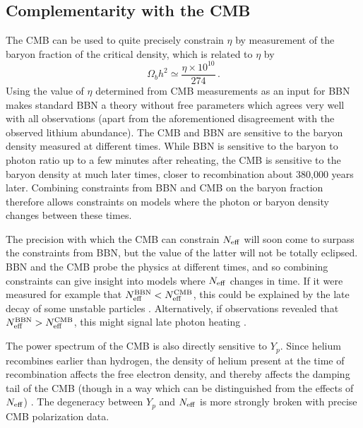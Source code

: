 



\subsection{Complementarity with the CMB}\label{Complementarity}
The CMB can be used to quite precisely constrain $\eta$ by measurement of the baryon fraction of the critical density, which is related to $\eta$ by
\begin{equation}
	\Omega_b h^2 \simeq \frac{\eta\times10^{10}}{274} \, .
\end{equation}
Using the value of $\eta$ determined from CMB measurements as an input for BBN makes standard BBN a theory without free parameters which agrees very well with all observations (apart from the aforementioned disagreement with the observed lithium abundance).  The CMB and BBN are sensitive to the baryon density measured at different times.  While BBN is sensitive to the baryon to photon ratio up to a few minutes after reheating, the CMB is sensitive to the baryon density at much later times, closer to recombination about 380,000 years later.  Combining constraints from BBN and CMB on the baryon fraction therefore allows constraints on models where the photon or baryon density changes between these times.

The precision with which the CMB can constrain $N_{\rm eff}$ will soon come to surpass the constraints from BBN, but the value of the latter will not be totally eclipsed.  BBN and the CMB probe the physics at different times, and so combining constraints can give insight into models where $N_{\rm eff}$ changes in time.  If it were measured for example that $N_{\rm eff}^{\mathrm{BBN}}<N_{\rm eff}^{\mathrm{CMB}}$, this could be explained by the late decay of some unstable particles \cite{Fischler:2010xz,Menestrina:2011mz,Hooper:2011aj}.  Alternatively, if observations revealed that $N_{\rm eff}^{\mathrm{BBN}}>N_{\rm eff}^{\mathrm{CMB}}$, this might signal late photon heating \cite{Cadamuro:2010cz,Millea:2015qra}.

The power spectrum of the CMB is also directly sensitive to $Y_p$.  Since helium recombines earlier than hydrogen, the density of helium present at the time of recombination affects the free electron density, and thereby affects the damping tail of the CMB (though in a way which can be distinguished from the effects of $N_{\rm eff}$) \cite{Bashinsky:2003tk,Hou:2011ec,Follin:2015hya,Baumann:2015rya}.  The degeneracy between $Y_p$ and $N_{\rm eff}$ is more strongly broken with precise CMB polarization data.

